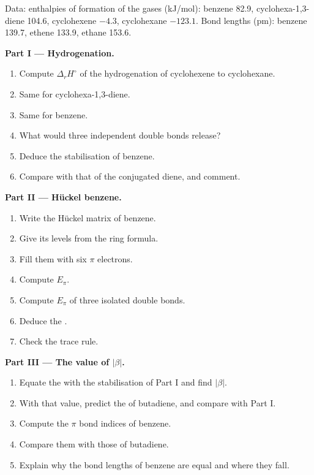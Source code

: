 \begin{problem}
\label{pb:b2:huckel:1}
Data: enthalpies of formation of the gases (\unit{kJ/mol}): benzene 82.9,
cyclohexa-1,3-diene 104.6, cyclohexene $-4.3$, cyclohexane $-123.1$. Bond lengths
(pm): benzene 139.7, ethene 133.9, ethane 153.6.

\medskip
\noindent\textbf{Part I --- Hydrogenation.}
\begin{enumerate}
  \item Compute $\Delta_r H^\circ$ of the hydrogenation of cyclohexene to cyclohexane.
  \item Same for cyclohexa-1,3-diene.
  \item Same for benzene.
  \item What would three independent double bonds release?
  \item Deduce the stabilisation of benzene.
  \item Compare with that of the conjugated diene, and comment.
\end{enumerate}

\medskip
\noindent\textbf{Part II --- Hückel benzene.}
\begin{enumerate}[resume]
  \item Write the Hückel matrix of benzene.
  \item Give its levels from the ring formula.
  \item Fill them with six $\pi$ electrons.
  \item Compute $E_\pi$.
  \item Compute $E_\pi$ of three isolated double bonds.
  \item Deduce the .
  \item Check the trace rule.
\end{enumerate}

\medskip
\noindent\textbf{Part III --- The value of $|\beta|$.}
\begin{enumerate}[resume]
  \item Equate the  with the stabilisation of Part I and find
        $|\beta|$.
  \item With that value, predict the  of butadiene, and compare
        with Part I.
  \item Compute the $\pi$ bond indices of benzene.
  \item Compare them with those of butadiene.
  \item Explain why the bond lengths of benzene are equal and where they fall.
\end{enumerate}


\end{problem}
